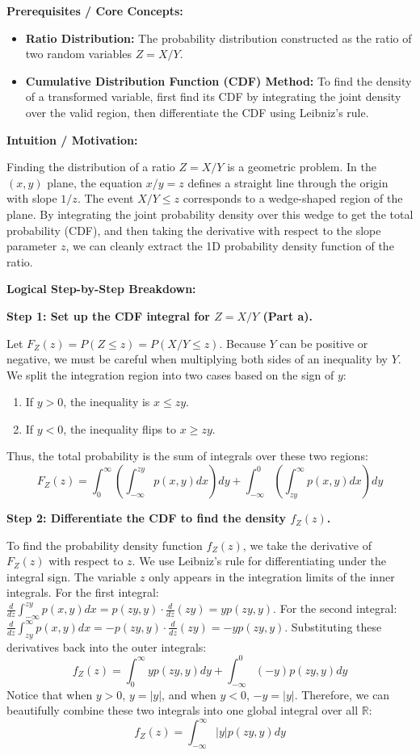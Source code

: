 \begin{solution}
\textbf{Prerequisites / Core Concepts:}
\begin{itemize}
    \item \textbf{Ratio Distribution:} The probability distribution constructed as the ratio of two random variables $Z = X/Y$.
    \item \textbf{Cumulative Distribution Function (CDF) Method:} To find the density of a transformed variable, first find its CDF by integrating the joint density over the valid region, then differentiate the CDF using Leibniz's rule.
\end{itemize}

\textbf{Intuition / Motivation:}

Finding the distribution of a ratio $Z = X/Y$ is a geometric problem. In the $(x, y)$ plane, the equation $x/y = z$ defines a straight line through the origin with slope $1/z$. The event $X/Y \leq z$ corresponds to a wedge-shaped region of the plane. By integrating the joint probability density over this wedge to get the total probability (CDF), and then taking the derivative with respect to the slope parameter $z$, we can cleanly extract the 1D probability density function of the ratio.

\textbf{Logical Step-by-Step Breakdown:}

\textbf{Step 1: Set up the CDF integral for $Z = X/Y$ (Part a).}

Let $F_Z(z) = P(Z \leq z) = P(X/Y \leq z)$.
Because $Y$ can be positive or negative, we must be careful when multiplying both sides of an inequality by $Y$. We split the integration region into two cases based on the sign of $y$:
\begin{enumerate}
    \item If $y > 0$, the inequality is $x \leq zy$.
    \item If $y < 0$, the inequality flips to $x \geq zy$.
\end{enumerate}
Thus, the total probability is the sum of integrals over these two regions:
\[ F_Z(z) = \int_{0}^{\infty} \left( \int_{-\infty}^{zy} p(x,y) dx \right) dy + \int_{-\infty}^{0} \left( \int_{zy}^{\infty} p(x,y) dx \right) dy \]

\textbf{Step 2: Differentiate the CDF to find the density $f_Z(z)$.}

To find the probability density function $f_Z(z)$, we take the derivative of $F_Z(z)$ with respect to $z$.
We use Leibniz's rule for differentiating under the integral sign. The variable $z$ only appears in the integration limits of the inner integrals.
For the first integral: $\frac{d}{dz} \int_{-\infty}^{zy} p(x,y) dx = p(zy, y) \cdot \frac{d}{dz}(zy) = y p(zy, y)$.
For the second integral: $\frac{d}{dz} \int_{zy}^{\infty} p(x,y) dx = -p(zy, y) \cdot \frac{d}{dz}(zy) = -y p(zy, y)$.
Substituting these derivatives back into the outer integrals:
\[ f_Z(z) = \int_{0}^{\infty} y p(zy, y) dy + \int_{-\infty}^{0} (-y) p(zy, y) dy \]
Notice that when $y > 0$, $y = |y|$, and when $y < 0$, $-y = |y|$. Therefore, we can beautifully combine these two integrals into one global integral over all $\mathbb{R}$:
\[ f_Z(z) = \int_{-\infty}^{\infty} |y| p(zy, y) dy \]


\end{solution}
